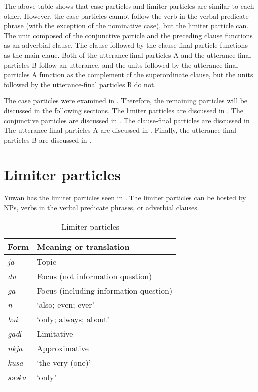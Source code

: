 The above table shows that case particles and limiter particles are similar to each other. However, the case particles cannot follow the verb in the verbal predicate phrase (with the exception of the nominative case), but the limiter particle can. The unit composed of the conjunctive particle and the preceding clause functions as an adverbial clause. The clause followed by the clause-final particle functions as the main claue. Both of the utterance-final particles A and the utterance-final particles B follow an utterance, and the units followed by the utterance-final particles A function as the complement of the superordinate clause, but the units followed by the utterance-final particles B do not.

The case particles were examined in . Therefore, the remaining particles will be discussed in the following sections. The limiter particles are discussed in . The conjunctive particles are discussed in . The clause-final particles are discussed in . The utterance-final particles A are discussed in . Finally, the utterance-final particles B are discussed in .

\section{Limiter particles}\label{sec:10.1}

Yuwan has the limiter particles seen in . The limiter particles can be hosted by NPs, verbs in the verbal predicate phrases, or adverbial clauses.

\begin{table}
\caption{Limiter particles\label{tab:97}}
\begin{tabular}{ll}
\lsptoprule
Form  & Meaning or translation\\\midrule
\textit{ja}    & Topic\\
\textit{du}    & Focus (not information question)\\
\textit{ga}    & Focus (including information question)\\
\textit{n}     & ‘also; even; ever’\\
\textit{bəi}   & ‘only; always; about’\\
\textit{gadɨ}  & Limitative\\
\textit{nkja}  & Approximative\\
\textit{kusa}  & ‘the very (one)’\\
\textit{səəka} & ‘only’\\\lspbottomrule
\end{tabular}
\end{table}

